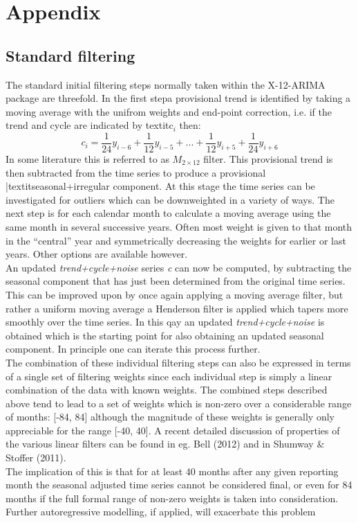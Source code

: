 \documentclass{article}
\begin{document}
\section*{Appendix}
\bigskip
\subsection*{Standard filtering}
The standard initial filtering steps normally taken within the X-12-ARIMA package are threefold. In the first stepa provisional trend is identified by taking a moving average with the unifrom weights and end-point correction, i.e. if the trend and cycle are indicated by textit{c$_i$} then:
\begin{equation*}
c_i=\frac{1}{24}y_{i-6}+\frac{1}{12}y_{i-5}+...+\frac{1}{12}y_{i+5}+\frac{1}{24}y_{i+6}
\end{equation*}
In some literature this is referred to as $M_{2\times12}$ filter. This provisional trend is then subtracted from the time series to produce a provisional |textit{seasonal+irregular} component. At this stage the time series can be investigated for outliers which can be downweighted in a variety of ways. The next step is for each calendar month to calculate a moving average using the same month in several successive years. Often most weight is given to that month in the ``central'' year and symmetrically decreasing the weights for earlier or last years. Other options are available however.\\An updated \textit{trend+cycle+noise} series \textit{c} can now be computed, by subtracting the seasonal component that has just been determined from the original time series. This can be improved upon by once again applying a moving average filter, but rather a uniform moving average a Henderson filter is applied which tapers more smoothly over the time series. In this qay an updated \textit{trend+cycle+noise} is obtained which is the starting point for also obtaining an updated seasonal component. In principle one can iterate this process further.\\The combination of these individual filtering steps can also be expressed in terms of a single set of filtering weights since each individual step is simply a linear combination of the data with known weights. The combined steps described above tend to lead to a set of weights which is non-zero over a considerable range of months: [-84, 84]
 although the magnitude of these weights is generally only appreciable for the range [-40, 40]. A recent detailed discussion of properties of the various linear filters can be found in eg. Bell (2012) and in Shumway \& Stoffer (2011).\\The implication of this is that for at least 40 months after any given reporting month the seasonal adjusted time series cannot be considered final, or even for 84 months if the full formal range of non-zero weights is taken into consideration. Further autoregressive modelling, if applied, will exacerbate this problem
 
\end{document}
